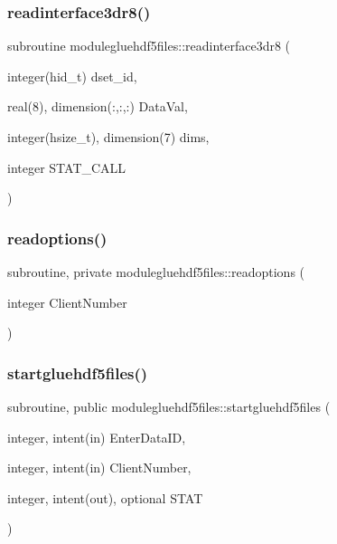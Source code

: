 \mbox{\label{namespacemodulegluehdf5files_a9d59684aa45b65c72b30b9ad0578c349}} 
\subsubsection{\texorpdfstring{readinterface3dr8()}{readinterface3dr8()}}
{\footnotesize\ttfamily subroutine modulegluehdf5files\+::readinterface3dr8 (\begin{DoxyParamCaption}\item[{integer(hid\+\_\+t)}]{dset\+\_\+id,  }\item[{real(8), dimension(\+:,\+:,\+:)}]{Data\+Val,  }\item[{integer(hsize\+\_\+t), dimension(7)}]{dims,  }\item[{integer}]{S\+T\+A\+T\+\_\+\+C\+A\+LL }\end{DoxyParamCaption})\hspace{0.3cm}{\ttfamily [private]}}

\mbox{\label{namespacemodulegluehdf5files_ab3d0b7d8a5a6cb877abaa35b1f974842}} 
\subsubsection{\texorpdfstring{readoptions()}{readoptions()}}
{\footnotesize\ttfamily subroutine, private modulegluehdf5files\+::readoptions (\begin{DoxyParamCaption}\item[{integer}]{Client\+Number }\end{DoxyParamCaption})\hspace{0.3cm}{\ttfamily [private]}}

\mbox{\label{namespacemodulegluehdf5files_ab2346fccf5401da3d9edc023aaadba24}} 
\subsubsection{\texorpdfstring{startgluehdf5files()}{startgluehdf5files()}}
{\footnotesize\ttfamily subroutine, public modulegluehdf5files\+::startgluehdf5files (\begin{DoxyParamCaption}\item[{integer, intent(in)}]{Enter\+Data\+ID,  }\item[{integer, intent(in)}]{Client\+Number,  }\item[{integer, intent(out), optional}]{S\+T\+AT }\end{DoxyParamCaption})}

